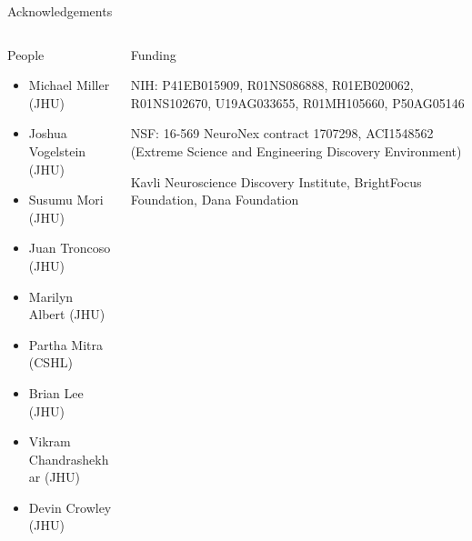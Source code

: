 \documentclass{beamer}
\begin{document}
\begin{frame}

\end{frame}
\begin{frame}{Acknowledgements}

\begin{columns}
\begin{column}{0.5\textwidth}
People
\begin{itemize}
\item Michael Miller (JHU)
\item Joshua Vogelstein (JHU)
\item Susumu Mori (JHU)
\item Juan Troncoso (JHU)
\item Marilyn Albert (JHU)
\item Partha Mitra (CSHL)
\item Brian Lee (JHU)
\item Vikram Chandrashekhar (JHU)
\item Devin Crowley (JHU)

\end{itemize}
\end{column}

\begin{column}{0.5\textwidth}
Funding

\vspace{1em}

NIH: P41EB015909, R01NS086888, R01EB020062, R01NS102670, U19AG033655, R01MH105660, P50AG05146

\vspace{1em}

NSF: 16-569 NeuroNex contract 1707298, ACI1548562 (Extreme Science and Engineering Discovery Environment)

\vspace{1em}

Kavli Neuroscience Discovery Institute, BrightFocus Foundation, Dana Foundation

\end{column}
\end{columns}

\end{frame}
\end{document}
